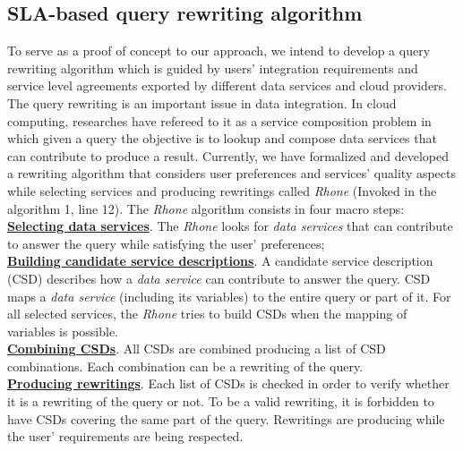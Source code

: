\subsection{SLA-based query rewriting algorithm}
To serve as a proof of concept to our approach, we intend to develop a query
rewriting algorithm which is guided by users' integration requirements and
service level agreements exported by different data services and cloud
providers. The query rewriting is an important issue in data integration. In
cloud computing, researches have refereed to it as a service composition problem
in which given a query the objective is to lookup and compose data services that
can contribute to produce a result. Currently, we have formalized and developed a rewriting
algorithm that considers user preferences and services' quality aspects while
selecting services and producing rewritings called \textit{Rhone} (Invoked in the algorithm 1, line 12).
The \textit{Rhone} algorithm consists in four macro steps: 
\\
\textbf{\underline{Selecting data services}}. The \textit{Rhone} looks for \textit{data services} that can contribute to answer the query while satisfying the user' preferences; \\
\textbf{\underline{Building candidate service descriptions}}. A candidate service description (CSD) describes how a \textit{data service} can contribute to answer the query. CSD maps a \textit{data service} (including its variables) to the entire query or part of it. For all selected services, the \textit{Rhone} tries to build CSDs when the mapping of variables is possible. \\
\textbf{\underline{Combining CSDs}}. All CSDs are combined producing a list of CSD combinations. Each combination can be a rewriting of the query. \\
\textbf{\underline{Producing rewritings}}. Each list of CSDs is checked in order to verify whether it is a rewriting of the query or not. To be a valid rewriting, it is forbidden to have CSDs covering the same part of the query. Rewritings are producing while the user' requirements are being respected.
%
